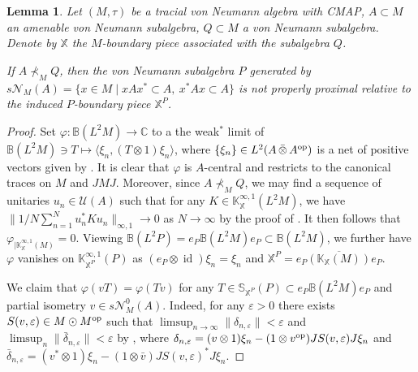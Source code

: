 \documentclass[a4paper,11pt]{amsart}
\newtheorem{lem}[thm]{Lemma}
\theoremstyle{definition}
\newcommand{\B}{{\mathbb B}}
\newcommand{\C}{{\mathbb C}}
\newcommand{\K}{{\mathbb K}}
\newcommand{\bS}{{\mathbb S}}
\newcommand{\X}{{\mathbb X}}
\newcommand{\cN}{{\mathcal N}}
\newcommand{\cU}{{\mathcal U}}
\newcommand{\id}{\operatorname{id}}
\newcommand{\ot}{\otimes}
\newcommand{\ovt}{\, \bar{\otimes}\,}
\newcommand{\op}{{\rm op}}
\begin{document}
\begin{lem}
Let $(M,\tau)$ be a tracial von Neumann algebra with CMAP, $A\subset M$ an amenable von Neumann subalgebra,
	$Q\subset M$ a von Neumann subalgebra. Denote by $\X$ the $M$-boundary piece associated with the subalgebra $Q$.
	
If $A\not\prec_{M} Q$, then the von Neumann subalgebra $P$ generated by  $s\cN_M(A)=\{x\in M\mid xAx^*\subset A,\ x^* A x\subset A\}$
	is not properly proximal relative to the induced $P$-boundary piece $\X^P$.
\end{lem}
\begin{proof}
Set $\varphi:\B(L^2M)\to \C$ to a the weak$^*$ limit of $\B(L^2M)\ni T\mapsto \langle \xi_n, (T\ot 1)\xi_n\rangle$,
	where $\{\xi_n\}\in L^2(A\ovt A^\op)$ is a net of  positive vectors given by \cite[Proposition 3.6]{BHV18}.
It is clear that $\varphi$ is $A$-central and restricts to the canonical traces on $M$ and $JMJ$.
Moreover, since $A\not\prec_{M} Q$, we may find a sequence of unitaries $u_n\in \cU(A)$ such that for any $K\in \K_\X^{\infty,1}(L^2M)$,
	we have $\|1/N\sum_{n=1}^N u_n^* Ku_n\|_{\infty,1}\to 0$ as $N\to\infty$ by the proof of \cite[Theorem 6.11]{DKEP22}.
It then follows that $\varphi_{\mid \K^{\infty,1}_\X(M)}=0$.
Viewing $\B(L^2P)=e_P \B(L^2M) e_P\subset \B(L^2M)$, we further have $\varphi$ vanishes on $\K_{\X^P}^{\infty,1}(P)$
	as $(e_P\ot \id)\xi_n=\xi_n$ and $\X^P=\overline{e_P(\K_\X(M))e_P}$.

We claim that $\varphi(vT)=\varphi(Tv)$ for any $T\in \bS_{\X^P}(P)\subset e_P\B(L^2M)e_P$ and partial isometry $v\in s\cN_M^0(A)$.
Indeed, for any $\varepsilon>0$ there exists $S(v,\varepsilon)\in M\odot M^\op$
	such that $\limsup_{n\to \infty}\|\delta_{n,\varepsilon}\|<\varepsilon$
		and  $\limsup_n \|\bar\delta_{n,\varepsilon}\|<\varepsilon$
	by \cite[Proposition 3.6]{BHV18},
	where  $\delta_{n,\varepsilon}=(v\ot 1)\xi_n-(1\ot v^\op) JS(v,\varepsilon)J\xi_n $
	and $\bar\delta_{n,\varepsilon}=(v^*\ot 1)\xi_n-(1\ot \bar v) JS(v,\varepsilon)^*J \xi_n$.


\end{proof}
\end{document}
